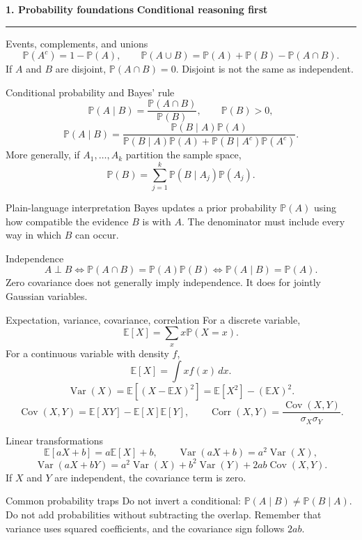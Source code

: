 \documentclass[10pt,a4paper]{article}
\newcommand{\sectionbanner}[2]{%
  \vspace{2mm}
  {\color{navy}\Large\bfseries #1}\hfill
  {\color{blue}\bfseries #2}
  \par\vspace{1mm}\color{line}\rule{\linewidth}{0.8pt}\color{ink}\vspace{2mm}
}
\newcommand{\E}{\mathbb{E}}
\newcommand{\Var}{\operatorname{Var}}
\newcommand{\Cov}{\operatorname{Cov}}
\newcommand{\Corr}{\operatorname{Corr}}
\newcommand{\Prob}{\mathbb{P}}
\begin{document}
\newpage
\sectionbanner{1. Probability foundations}{Conditional reasoning first}

\begin{formulabox}{Events, complements, and unions}
\[
\Prob(A^c)=1-\Prob(A),\qquad
\Prob(A\cup B)=\Prob(A)+\Prob(B)-\Prob(A\cap B).
\]
If $A$ and $B$ are disjoint, $\Prob(A\cap B)=0$. Disjoint is not the same as independent.
\end{formulabox}

\begin{formulabox}{Conditional probability and Bayes' rule}
\[
\Prob(A\mid B)=\frac{\Prob(A\cap B)}{\Prob(B)},\qquad \Prob(B)>0,
\]
\[
\Prob(A\mid B)=
\frac{\Prob(B\mid A)\Prob(A)}{\Prob(B\mid A)\Prob(A)+\Prob(B\mid A^c)\Prob(A^c)}.
\]
More generally, if $A_1,\ldots,A_k$ partition the sample space,
\[
\Prob(B)=\sum_{j=1}^{k}\Prob(B\mid A_j)\Prob(A_j).
\]
\end{formulabox}

\begin{keybox}{Plain-language interpretation}
Bayes updates a prior probability $\Prob(A)$ using how compatible the evidence $B$ is with $A$. The denominator must include every way in which $B$ can occur.
\end{keybox}

\begin{formulabox}{Independence}
\[
A\perp B \iff \Prob(A\cap B)=\Prob(A)\Prob(B)
\iff \Prob(A\mid B)=\Prob(A).
\]
Zero covariance does not generally imply independence. It does for jointly Gaussian variables.
\end{formulabox}

\begin{formulabox}{Expectation, variance, covariance, correlation}
For a discrete variable,
\[
\E[X]=\sum_x x\Prob(X=x).
\]
For a continuous variable with density $f$,
\[
\E[X]=\int x f(x)\,dx.
\]
\[
\Var(X)=\E[(X-\E X)^2]=\E[X^2]-(\E X)^2.
\]
\[
\Cov(X,Y)=\E[XY]-\E[X]\E[Y],\qquad
\Corr(X,Y)=\frac{\Cov(X,Y)}{\sigma_X\sigma_Y}.
\]
\end{formulabox}

\begin{formulabox}{Linear transformations}
\[
\E[aX+b]=a\E[X]+b,\qquad \Var(aX+b)=a^2\Var(X),
\]
\[
\Var(aX+bY)=a^2\Var(X)+b^2\Var(Y)+2ab\Cov(X,Y).
\]
If $X$ and $Y$ are independent, the covariance term is zero.
\end{formulabox}

\begin{trapbox}{Common probability traps}
Do not invert a conditional: $\Prob(A\mid B)\neq\Prob(B\mid A)$. Do not add probabilities without subtracting the overlap. Remember that variance uses squared coefficients, and the covariance sign follows $2ab$.
\end{trapbox}
\end{document}
